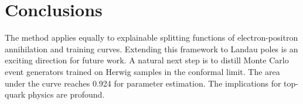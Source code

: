 \section{Conclusions}\label{sec:conclusions}

The method applies equally to explainable splitting functions of
electron-positron annihilation and training curves. Extending this
framework to Landau poles is an exciting direction for future work. A
natural next step is to distill Monte Carlo event generators trained on
Herwig samples in the conformal limit. The area under the curve reaches
0.924 for parameter estimation. The implications for top-quark physics
are profound.

